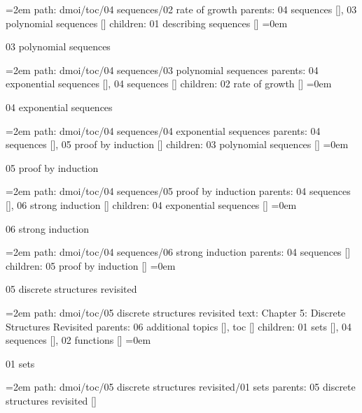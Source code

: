 \par\begingroup
\leftskip=2em
path: dmoi/toc/04 sequences/02 rate of growth
\smallskip
parents:  04 sequences [], 03 polynomial sequences []
\smallskip
children: 01 describing sequences []
\smallskip
\leftskip=0em
\par\endgroup
\bigskip
{}
03 polynomial sequences
\smallskip
\par\begingroup
\leftskip=2em
path: dmoi/toc/04 sequences/03 polynomial sequences
\smallskip
parents:  04 exponential sequences [], 04 sequences []
\smallskip
children: 02 rate of growth []
\smallskip
\leftskip=0em
\par\endgroup
\bigskip
{}
04 exponential sequences
\smallskip
\par\begingroup
\leftskip=2em
path: dmoi/toc/04 sequences/04 exponential sequences
\smallskip
parents:  04 sequences [], 05 proof by induction []
\smallskip
children: 03 polynomial sequences []
\smallskip
\leftskip=0em
\par\endgroup
\bigskip
{}
05 proof by induction
\smallskip
\par\begingroup
\leftskip=2em
path: dmoi/toc/04 sequences/05 proof by induction
\smallskip
parents:  04 sequences [], 06 strong induction []
\smallskip
children: 04 exponential sequences []
\smallskip
\leftskip=0em
\par\endgroup
\bigskip
{}
06 strong induction
\smallskip
\par\begingroup
\leftskip=2em
path: dmoi/toc/04 sequences/06 strong induction
\smallskip
parents:  04 sequences []
\smallskip
children: 05 proof by induction []
\smallskip
\leftskip=0em
\par\endgroup
\bigskip
{}
05 discrete structures revisited
\smallskip
\par\begingroup
\leftskip=2em
path: dmoi/toc/05 discrete structures revisited
\smallskip
text:  Chapter 5: Discrete Structures Revisited
\smallskip
parents:  06 additional topics [], toc []
\smallskip
children: 01 sets [], 04 sequences [], 02 functions []
\smallskip
\leftskip=0em
\par\endgroup
\bigskip
{}
01 sets
\smallskip
\par\begingroup
\leftskip=2em
path: dmoi/toc/05 discrete structures revisited/01 sets
\smallskip
parents:  05 discrete structures revisited []
